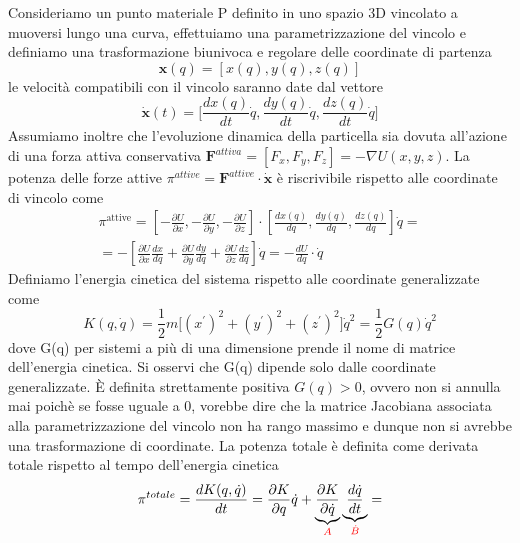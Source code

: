 Consideriamo un punto materiale P definito in uno spazio 3D vincolato a muoversi lungo una curva, effettuiamo una parametrizzazione del vincolo e definiamo una trasformazione biunivoca e regolare delle coordinate di partenza
\begin{equation}
	\bm{x}(q) = [x(q),y(q),z(q)]
\end{equation}
le velocit\`{a} compatibili con il vincolo saranno date dal vettore 
\begin{equation}
	\dot{\bm{x}}(t) = \Big [\frac{dx(q)}{dt}\dot{q},\frac{dy(q)}{dt}\dot{q},\frac{dz(q)}{dt}\dot{q} \Big ]
\end{equation}
Assumiamo inoltre che l'evoluzione dinamica della particella sia dovuta all'azione di una forza attiva conservativa $\bm{F}^{attiva} = [F_x,F_y,F_z] = - \nabla U(x,y,z)$.
La potenza delle forze attive $\pi^{attive} = \bm{F}^{attive} \cdot \dot{\bm{x}}$ \`{e} riscrivibile rispetto alle coordinate di vincolo come 
\begin{align}
\pi^{\text {attive}}=\left[-\frac{\partial U}{\partial x},-\frac{\partial U}{\partial y},-\frac{\partial U}{\partial z}\right]\cdot\left[\frac{dx(q)}{dq},\frac{dy(q)}{dq},\frac{dz(q)}{dq}\right] \dot{q} = \\[0.2in]
= -\left[\frac{\partial U}{\partial x} \frac{d x}{d q}+\frac{\partial U}{\partial y} \frac{d y}{d q}+\frac{\partial U}{\partial z} \frac{d z}{d q}\right] \dot{q} = - \frac{dU}{dq} \cdot \dot{q}
\end{align}
Definiamo l'energia cinetica del sistema rispetto alle coordinate generalizzate come
\begin{equation}
	K(q,\dot{q}) = \frac{1}{2} m \Big [ (x^{\prime})^2 + (y^{\prime})^2 + (z^{\prime})^2 \Big] \dot{q}^2 = \frac{1}{2} G(q)\dot{q}^2 
\end{equation}
dove G(q) per sistemi a pi\`{u} di una dimensione prende il nome di matrice dell'energia cinetica. Si osservi che G(q) dipende solo dalle coordinate generalizzate. \`{E} definita strettamente positiva $G(q) > 0$, ovvero non si annulla mai poich\`{e} se fosse uguale a 0, vorebbe dire che la matrice Jacobiana associata alla parametrizzazione del vincolo non ha rango massimo e dunque non si avrebbe una trasformazione di coordinate.
La potenza totale \`{e} definita come derivata totale rispetto al tempo dell'energia cinetica
\begin{equation}
	\pi ^{totale} = \frac{dK(q,\dot{q})}{dt} = \frac{\partial K}{\partial q}\dot{q} + \underbrace{\frac{\partial K}{\partial\dot{q}}}_{\textcolor{red}{A}} \underbrace{\frac{d \dot{q}}{dt}}_{\textcolor{red}{\dot{B}}}=
\end{equation}
